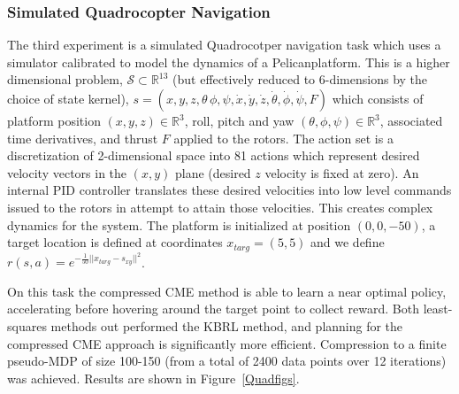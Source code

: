 \documentclass[letterpaper]{article}
\newcommand{\cS}{{\mathcal S}}
\newcommand{\R}{{\mathbb R}}
\begin{document}
\subsubsection{Simulated Quadrocopter Navigation}

The third experiment is a simulated Quadrocotper navigation task which uses a simulator \citep{denardi2013rn} calibrated to model the dynamics of a Pelican\texttrademark  platform. This is a higher dimensional problem, $\cS\subset\R^{13}$ (but effectively reduced to 6-dimensions by the choice of state kernel), $s=(x,y,z,\theta\,\phi,\psi,\dot{x},\dot{y},\dot{z},\dot{\theta},\dot{\phi},\dot{\psi},F)$ which consists of platform position $(x,y,z)\in\R^3$, roll, pitch and yaw $(\theta,\phi,\psi)\in\R^3$, associated time derivatives, and thrust $F$ applied to the rotors. The action set is a discretization of 2-dimensional space into 81 actions which represent desired velocity vectors in the $(x,y)$ plane (desired $z$ velocity is fixed at zero). An internal PID controller translates these desired velocities into low level commands issued to the rotors in attempt to attain those velocities. This creates complex dynamics for the system. The platform is initialized at position $(0,0,-50)$, a target location is defined at coordinates $x_{targ} = (5,5)$ and we define $r(s,a)=e^{-\frac{1}{50}||x_{targ}-s_{xy}||^{2}}$.

On this task the compressed CME method is able to learn a near optimal policy, accelerating before hovering around the target point to collect reward. Both least-squares methods out performed the KBRL method, and planning for the compressed CME approach is significantly more efficient. Compression to a finite pseudo-MDP of size 100-150 (from a total of 2400 data points over 12 iterations) was achieved. Results are shown in Figure~\ref{Quadfigs}.
\end{document}
